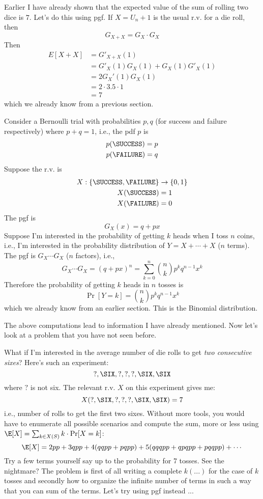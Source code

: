 Earlier I have already shown that the expected value of the sum of rolling two
dice is $7$.
Let's do this using pgf.
If $X = U_n + 1$ is the usual r.v. for a die roll, then
\[
G_{X + X} = G_X \cdot G_X 
\]
Then
\begin{align*}
  E[X + X]
  &= G'_{X+X}(1)\\
  &= G'_X(1) G_X(1) + G_X(1) G'_X(1) \\
  &= 2G_X'(1) G_X(1) \\
  &= 2 \cdot 3.5 \cdot 1 \\
  &= 7
\end{align*}
which we already know from a previous section.

Consider a Bernoulli trial with probabilities $p, q$ (for success and failure respectively)
where $p + q = 1$, i.e., the pdf $p$ is
\begin{align*}
  p(\SUCCESS) = p \\
  p(\FAILURE) = q \\
\end{align*}
Suppose the r.v. is
\begin{align*}
  X: \{ \SUCCESS, \FAILURE \} &\rightarrow \{0, 1\} \\
    X(\SUCCESS) &= 1 \\
    X(\FAILURE) &= 0 \\
\end{align*}
The pgf is
\[
G_X(x) = q + px
\]
Suppose I'm interested in the probability of getting $k$ heads when I
toss $n$ coins, i.e., I'm interested in the probability
distribution of $Y = X + \cdots + X$ ($n$ terms).
The pgf is $G_X \cdots G_X$ ($n$ factors), i.e.,
\[
G_X \cdots G_X = (q + px)^n = \sum_{k = 0}^n \binom{n}{k} p^kq^{n-1} x^k 
\]
Therefore the probability of getting $k$ heads in $n$ tosses is
\[
\Pr[Y = k] = \binom{n}{k} p^kq^{n-1} x^k
\]
which we already know from an earlier section.
This is the Binomial distribution.

The above computations lead to information I have already mentioned.
Now let's look at a  problem that you have not seen before.

What if I'm interested in the average number of die rolls
to get \textit{two consecutive sixes}?
Here's such an experiment:
\[
?, \SIX, ?, ?, ?, \SIX, \SIX
\]
where $?$ is not six.
The relevant r.v. $X$ on this experiment gives me:
\[
X(?, \SIX, ?, ?, ?, \SIX, \SIX) = 7
\]
i.e., number of rolls to get the first two sixes.
Without more tools, you would have to enumerate all possible
scenarios and compute the sum, more or less using
$\E[X] = \sum_{k \in X(S)} k \cdot \Pr[X = k]$:
\[
\E[X] = 2pp + 3qpp + 4(qqpp + pqpp) + 5(qqqpp + qpqpp + pqqpp) + \cdots
\]
Try a few terms yourself say up to the probability for 7 tosses.
See the nightmare?
The problem is first of all writing a complete
$k(...)$ for the case of $k$ tosses and secondly how to organize
the infinite number of terms in such a way that you can sum of the terms.
Let's try using pgf instead ...

